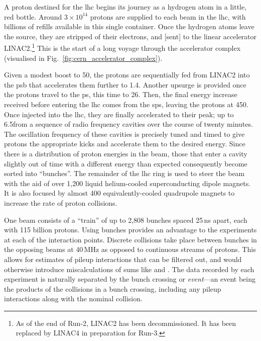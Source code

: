 A proton destined for the \acrshort{lhc} begins its journey as a hydrogen atom in a little, red bottle. Around $\text{3} \times \text{10}^{\text{14}}$ protons are supplied to each beam in the \acrshort{lhc}, with billions of refills available in this single container. Once the hydrogen atoms leave the source, they are stripped of their electrons, and [sent] to the linear accelerator LINAC2.\footnote{As of the end of Run-2, LINAC2 has been decommissioned. It has been replaced by LINAC4 in preparation for Run-3.} This is the start of a long voyage through the accelerator complex (visualised in Fig.~\ref{fig:cern_accelerator_complex}).

Given a modest boost to 50\MeV, the protons are sequentially fed from LINAC2 into the \acrfull{psb} that accelerates them further to 1.4\GeV. Another upsurge is provided once the protons travel to the \acrfull{ps}, this time to 26\GeV. Then, the final energy increase received before entering the \acrshort{lhc} comes from the \acrfull{sps}, leaving the protons at 450\GeV. Once injected into the \acrshort{lhc}, they are finally accelerated to their peak; up to 6.5\TeV from a sequence of radio frequency cavities over the course of twenty minutes. The oscillation frequency of these cavities is precisely tuned and timed to give protons the appropriate kicks and accelerate them to the desired energy. Since there is a distribution of proton energies in the beam, those that enter a cavity slightly out of time with a different energy than expected consequently become sorted into ``bunches''. The remainder of the \acrshort{lhc} ring is used to steer the beam with the aid of over 1,200 liquid helium-cooled superconducting dipole magnets. It is also focused by almost 400 equivalently-cooled quadrupole magnets to increase the rate of proton collisions.

One beam consists of a ``train'' of up to 2,808 bunches spaced 25\,ns apart, each with 115 billion protons. Using bunches provides an advantage to the experiments at each of the interaction points. Discrete collisions take place between bunches in the opposing beams at 40\,MHz as opposed to continuous streams of protons. This allows for estimates of \gls{pileup} interactions that can be filtered out, and would otherwise introduce miscalculations of sums like \ptmiss and \HT. The data recorded by each experiment is naturally separated by the bunch crossing or \emph{event}---an event being the products of the collisions in a bunch crossing, including any \gls{pileup} interactions along with the nominal collision.

